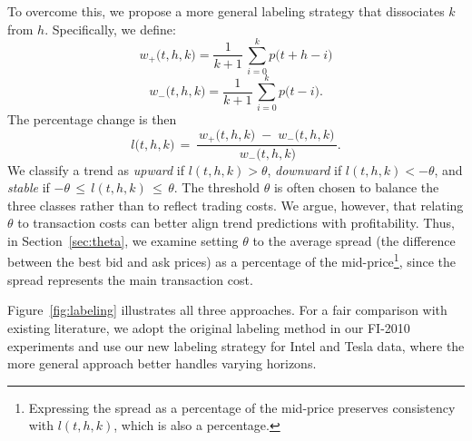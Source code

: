 To overcome this, we propose a more general labeling strategy that dissociates $k$ from $h$. Specifically, we define:
\begin{equation}
w_+\bigl(t, h, k\bigr) = \frac{1}{k+1}\,\sum_{i=0}^k p\bigl(t + h - i\bigr)
\end{equation}
\begin{equation}
w_-\bigl(t, h, k\bigr) = \frac{1}{k+1}\,\sum_{i=0}^k p\bigl(t - i\bigr).
\end{equation}
The percentage change is then
\begin{equation}
l\bigl(t, h, k\bigr) 
\,=\, \frac{\,w_+\bigl(t, h, k\bigr) \;-\; w_-\bigl(t, h, k\bigr)\,}
             {\,w_-\bigl(t, h, k\bigr)\!}.
\end{equation}
We classify a trend as \emph{upward} if $l(t,h,k) > \theta$, 
\emph{downward} if $l(t,h,k) < -\theta$, 
and \emph{stable} if $-\theta \,\leq\, l(t,h,k) \,\leq\, \theta$.
The threshold $\theta$ is often chosen to balance the three classes rather than to reflect trading costs. We argue, however, that relating $\theta$ to transaction costs can better align trend predictions with profitability. 
Thus, in Section~\ref{sec:theta}, we examine setting $\theta$ to the average spread (the difference between the best bid and ask prices) as a percentage of the mid-price\footnote{Expressing the spread as a percentage of the mid-price preserves consistency with $l(t,h,k)$, which is also a percentage.}, since the spread represents the main transaction cost.



Figure~\ref{fig:labeling} illustrates all three approaches. 
For a fair comparison with existing literature, we adopt the original labeling method in our FI-2010 experiments and use our new labeling strategy for Intel and Tesla data, where the more general approach better handles varying horizons.
